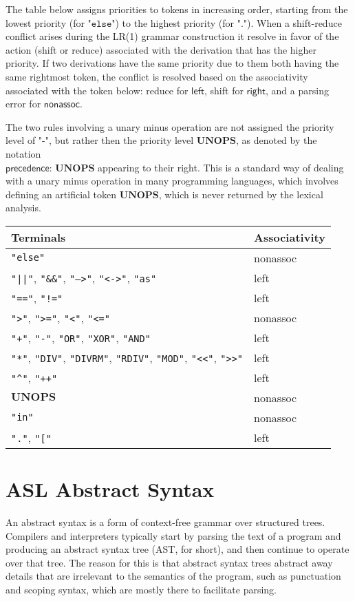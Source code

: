 \documentclass{book}
\newcommand\terminal[1]{\mathtt{\mathbf{#1}}}
\newcommand\verbatimterminal[2]{\texttt{"}\texttt{#2}\texttt{"}}
\newcommand\Tand[0]{\verbatimterminal{AND}{AND}}
\newcommand\Tas[0]{\verbatimterminal{AS}{as}}
\newcommand\Tband[0]{\verbatimterminal{BAND}{\&\&}}
\newcommand\Tbeq[0]{\verbatimterminal{BEQ}{<->}}
\newcommand\Tbor[0]{\verbatimterminal{BOR}{||}}
\newcommand\Tconcat[0]{\verbatimterminal{CONCAT}{++}}
\newcommand\Tdiv[0]{\verbatimterminal{DIV}{DIV}}
\newcommand\Tdivrm[0]{\verbatimterminal{DIVRM}{DIVRM}}
\newcommand\Tdot[0]{\verbatimterminal{DOT}{.}}
\newcommand\Telse[0]{\verbatimterminal{ELSE}{else}}
\newcommand\Txor[0]{\verbatimterminal{XOR}{XOR}}
\newcommand\Teqop[0]{\verbatimterminal{EQ\_OP}{==}}
\newcommand\Tgeq[0]{\verbatimterminal{GEQ}{>=}}
\newcommand\Tgt[0]{\verbatimterminal{GT}{>}}
\newcommand\Timpl[0]{\verbatimterminal{IMPL}{-->}}
\newcommand\Tin[0]{\verbatimterminal{IN}{in}}
\newcommand\Tlbracket[0]{\verbatimterminal{LBRACKET}{[}}
\newcommand\Tleq[0]{\verbatimterminal{LEQ}{<=}}
\newcommand\Tlt[0]{\verbatimterminal{LT}{<}}
\newcommand\Tminus[0]{\verbatimterminal{MINUS}{-}}
\newcommand\Tmod[0]{\verbatimterminal{MOD}{MOD}}
\newcommand\Tmul[0]{\verbatimterminal{MUL}{*}}
\newcommand\Tneq[0]{\verbatimterminal{NEQ}{!=}}
\newcommand\Tor[0]{\verbatimterminal{OR}{OR}}
\newcommand\Tplus[0]{\verbatimterminal{PLUS}{+}}
\newcommand\Tpow[0]{\verbatimterminal{POW}{\^{}}}
\newcommand\Trdiv[0]{\verbatimterminal{RDIV}{RDIV}}
\newcommand\Tshl[0]{\verbatimterminal{SHL}{<<}}
\newcommand\Tshr[0]{\verbatimterminal{SHR}{>>}}
\newcommand\Tunops[0]{\terminal{UNOPS}}
\newcommand\precedence[1]{\textsf{precedence: }#1}
\newcommand\nonassoc[0]{\textsf{nonassoc}}
\newcommand\leftassoc[0]{\textsf{left}}
\newcommand\rightassoc[0]{\textsf{right}}
\begin{document}
The table below assigns priorities to tokens in increasing order, starting from the lowest priority (for $\Telse$)
to the highest priority (for $\Tdot$).
When a shift-reduce conflict arises during the LR(1) grammar construction
it resolve in favor of the action (shift or reduce) associated with the derivation that has the higher priority.
If two derivations have the same priority due to them both having the same rightmost token,
the conflict is resolved based on the associativity associated with the token below:
reduce for $\leftassoc$, shift for $\rightassoc$, and a parsing error for $\nonassoc$.

The two rules involving a unary minus operation are not assigned the priority level of $\Tminus$,
but rather then the priority level $\Tunops$, as denoted by the notation \\
$\precedence{\Tunops}$
appearing to their right. This is a standard way of dealing with a unary minus operation
in many programming languages, which involves defining an artificial token $\Tunops$,
which is never returned by the lexical analysis.

\begin{center}
\begin{tabular}{ll}
\textbf{Terminals} & \textbf{Associativity}\\
\hline
\Telse & \nonassoc\\
\Tbor, \Tband, \Timpl, \Tbeq, \Tas & \leftassoc\\
\Teqop, \Tneq & \leftassoc\\
\Tgt, \Tgeq, \Tlt, \Tleq & \nonassoc\\
\Tplus, \Tminus, \Tor, \Txor, \Tand & \leftassoc\\
\Tmul, \Tdiv, \Tdivrm, \Trdiv, \Tmod, \Tshl, \Tshr & \leftassoc\\
\Tpow, \Tconcat & \leftassoc\\
$\Tunops$ & \nonassoc\\
\Tin & \nonassoc\\
\Tdot, \Tlbracket & \leftassoc
\end{tabular}
\end{center}

\chapter{ASL Abstract Syntax \label{chap:ASLAbstractSyntax}}
An abstract syntax is a form of context-free grammar over structured trees.
Compilers and interpreters typically start by parsing the text of a program and producing an abstract syntax tree (AST, for short),
and then continue to operate over that tree.
%
The reason for this is that abstract syntax trees abstract away details that are irrelevant to the semantics of the program,
such as punctuation and scoping syntax, which are mostly there to facilitate parsing.
\end{document}
